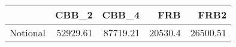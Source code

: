 \begin{tabular}{lrrrr}
\toprule
{} &     CBB\_2 &     CBB\_4 &      FRB &      FRB2 \\
\midrule
Notional &  52929.61 &  87719.21 &  20530.4 &  26500.51 \\
\bottomrule
\end{tabular}

